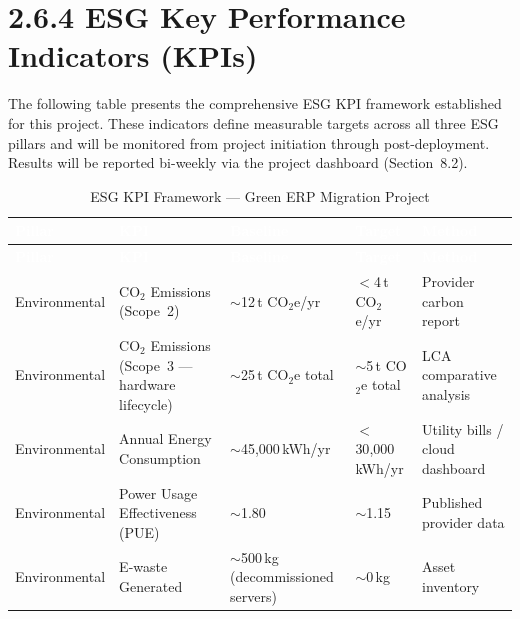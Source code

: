 \section{2.6.4 ESG Key Performance Indicators (KPIs)}

The following table presents the comprehensive ESG KPI framework
established for this project. These indicators define measurable targets
across all three ESG pillars and will be monitored from project initiation
through post-deployment. Results will be reported bi-weekly via the project
dashboard (Section~8.2).

\vspace{0.5em}

\begin{longtable}{%
  p{2.2cm}
  p{3.5cm}
  p{2.2cm}
  p{2.2cm}
  p{3.0cm}}

\caption{ESG KPI Framework --- Green ERP Migration Project}
\label{tab:esg-kpi} \\

\rowcolor{headerrow}
\textcolor{white}{\textbf{Pillar}} &
\textcolor{white}{\textbf{KPI}} &
\textcolor{white}{\textbf{Baseline}} &
\textcolor{white}{\textbf{Target}} &
\textcolor{white}{\textbf{Method}} \\
\midrule
\endfirsthead

\rowcolor{headerrow}
\textcolor{white}{\textbf{Pillar}} &
\textcolor{white}{\textbf{KPI}} &
\textcolor{white}{\textbf{Baseline}} &
\textcolor{white}{\textbf{Target}} &
\textcolor{white}{\textbf{Method}} \\
\midrule
\endhead

\rowcolor{rowalt}
  Environmental &
  CO$_2$ Emissions (Scope~2) &
  $\sim$12\,t CO$_2$e/yr &
  $<$4\,t CO$_2$e/yr &
  Provider carbon report \\

  Environmental &
  CO$_2$ Emissions (Scope~3 --- hardware lifecycle) &
  $\sim$25\,t CO$_2$e total &
  $\sim$5\,t CO$_2$e total &
  LCA comparative analysis \\

\rowcolor{rowalt}
  Environmental &
  Annual Energy Consumption &
  $\sim$45{,}000\,kWh/yr &
  $<$30{,}000\,kWh/yr &
  Utility bills / cloud dashboard \\

  Environmental &
  Power Usage Effectiveness (PUE) &
  $\sim$1.80 &
  $\sim$1.15 &
  Published provider data \\

\rowcolor{rowalt}
  Environmental &
  E-waste Generated &
  $\sim$500\,kg (decommissioned servers) &
  $\sim$0\,kg &
  Asset inventory \\


\end{longtable}
